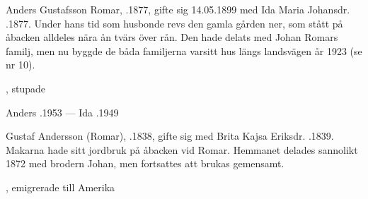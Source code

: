 %
Anders Gustafsson Romar, .1877, gifte sig 14.05.1899 med Ida Maria Johansdr. .1877. Under hans tid som husbonde revs den gamla gården ner, som stått på åbacken alldeles nära ån tvärs över rån. Den hade delats med Johan Romars familj, men nu byggde de båda familjerna varsitt hus längs landsvägen år 1923 (se nr 10).
\begin{jhchildren}
  \item {}
  \item {}
  \item {}
  \item {}, stupade
  \item {}
  \item {}
\end{jhchildren}

Anders .1953  ---  Ida .1949



%



%
Gustaf Andersson (Romar), .1838, gifte sig med Brita Kajsa Eriksdr. .1839. Makarna hade sitt jordbruk på åbacken vid Romar. Hemmanet delades sannolikt 1872 med brodern Johan, men fortsattes att brukas gemensamt.
\begin{jhchildren}
  \item {}, emigrerade till Amerika
  \item {}
  \item {}
\end{jhchildren}

